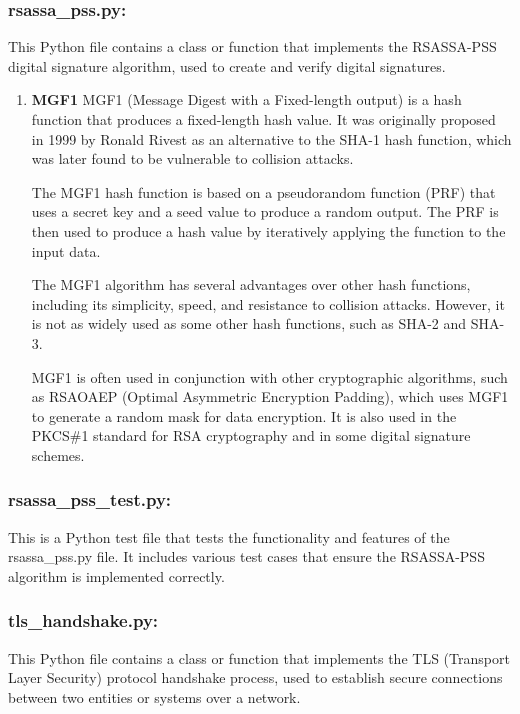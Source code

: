 \documentclass{article}
\begin{document}
\subsubsection{rsassa\_pss.py:} This Python file contains a class or function that implements the RSASSA-PSS digital signature algorithm, used to create and verify digital signatures.

\begin{center}
    \begin{enumerate}
        \item \textbf{MGF1}
        MGF1 (Message Digest with a Fixed-length output) is a hash function that produces a fixed-length hash value. It was originally proposed in 1999 by Ronald Rivest as an alternative to the SHA-1 hash function, which was later found to be vulnerable to collision attacks.

The MGF1 hash function is based on a pseudorandom function (PRF) that uses a secret key and a seed value to produce a random output. The PRF is then used to produce a hash value by iteratively applying the function to the input data.

The MGF1 algorithm has several advantages over other hash functions, including its simplicity, speed, and resistance to collision attacks. However, it is not as widely used as some other hash functions, such as SHA-2 and SHA-3.

MGF1 is often used in conjunction with other cryptographic algorithms, such as RSA\-OAEP (Optimal Asymmetric Encryption Padding), which uses MGF1 to generate a random mask for data encryption. It is also used in the PKCS\#1 standard for RSA cryptography and in some digital signature schemes.
    \end{enumerate}
\end{center}

\subsubsection{rsassa\_pss\_test.py:} This is a Python test file that tests the functionality and features of the rsassa\_pss.py file.
It includes various test cases that ensure the RSASSA-PSS algorithm is implemented correctly.

\subsubsection{tls\_handshake.py:} This Python file contains a class or function that implements the TLS (Transport Layer Security) protocol handshake process, used to establish secure connections between two entities or systems over a network.
\end{document}
